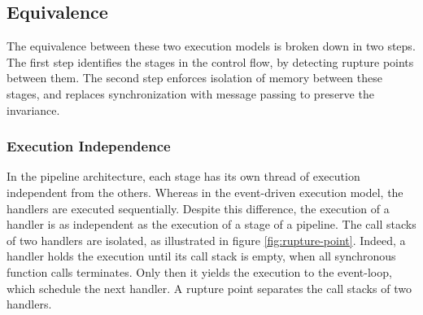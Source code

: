 


\subsection{Equivalence} \label{chapter4:equivalence}

The equivalence between these two execution models is broken down in two steps. %
The first step identifies the stages in the control flow, by detecting rupture points between them.
The second step enforces isolation of memory between these stages, and replaces synchronization with message passing to preserve the invariance.

\subsubsection{Execution Independence}

In the pipeline architecture, each stage has its own thread of execution independent from the others.
Whereas in the event-driven execution model, the handlers are executed sequentially.
Despite this difference, the execution of a handler is as independent as the execution of a stage of a pipeline.
The call stacks of two handlers are isolated, as illustrated in figure \ref{fig:rupture-point}.
Indeed, a handler holds the execution until its call stack is empty, when all synchronous function calls terminates. Only then it yields the execution to the event-loop, which schedule the next handler.
A rupture point separates the call stacks of two handlers.

